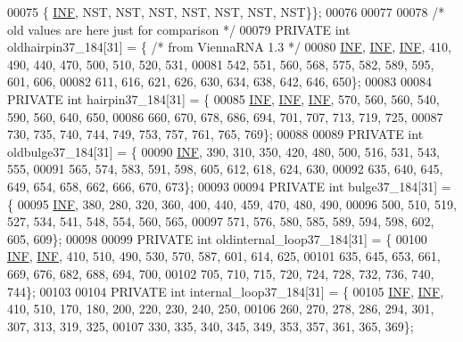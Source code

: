 \begin{DoxyCode}
00075   \{  \hyperlink{energy__const_8h_a12c2040f25d8e3a7b9e1c2024c618cb6}{INF},   NST,   NST,   NST,   NST,   NST,   NST, NST\}\};
00076 
00077 
00078 \textcolor{comment}{/* old values are here just for comparison */}
00079 PRIVATE \textcolor{keywordtype}{int} oldhairpin37\_184[31] = \{ \textcolor{comment}{/* from ViennaRNA 1.3 */}
00080   \hyperlink{energy__const_8h_a12c2040f25d8e3a7b9e1c2024c618cb6}{INF}, \hyperlink{energy__const_8h_a12c2040f25d8e3a7b9e1c2024c618cb6}{INF}, \hyperlink{energy__const_8h_a12c2040f25d8e3a7b9e1c2024c618cb6}{INF}, 410, 490, 440, 470, 500, 510, 520, 531,
00081        542, 551, 560, 568, 575, 582, 589, 595, 601, 606,
00082        611, 616, 621, 626, 630, 634, 638, 642, 646, 650\};
00083 
00084 PRIVATE \textcolor{keywordtype}{int} hairpin37\_184[31] = \{
00085   \hyperlink{energy__const_8h_a12c2040f25d8e3a7b9e1c2024c618cb6}{INF}, \hyperlink{energy__const_8h_a12c2040f25d8e3a7b9e1c2024c618cb6}{INF}, \hyperlink{energy__const_8h_a12c2040f25d8e3a7b9e1c2024c618cb6}{INF}, 570, 560, 560, 540, 590, 560, 640, 650,
00086        660, 670, 678, 686, 694, 701, 707, 713, 719, 725,
00087        730, 735, 740, 744, 749, 753, 757, 761, 765, 769\};
00088 
00089 PRIVATE \textcolor{keywordtype}{int} oldbulge37\_184[31] = \{
00090   \hyperlink{energy__const_8h_a12c2040f25d8e3a7b9e1c2024c618cb6}{INF}, 390, 310, 350, 420, 480, 500, 516, 531, 543, 555,
00091        565, 574, 583, 591, 598, 605, 612, 618, 624, 630,
00092        635, 640, 645, 649, 654, 658, 662, 666, 670, 673\};
00093 
00094 PRIVATE \textcolor{keywordtype}{int} bulge37\_184[31] = \{
00095   \hyperlink{energy__const_8h_a12c2040f25d8e3a7b9e1c2024c618cb6}{INF}, 380, 280, 320, 360, 400, 440, 459, 470, 480, 490,
00096        500, 510, 519, 527, 534, 541, 548, 554, 560, 565,
00097   571, 576, 580, 585, 589, 594, 598, 602, 605, 609\};
00098 
00099 PRIVATE \textcolor{keywordtype}{int} oldinternal\_loop37\_184[31] = \{
00100   \hyperlink{energy__const_8h_a12c2040f25d8e3a7b9e1c2024c618cb6}{INF}, \hyperlink{energy__const_8h_a12c2040f25d8e3a7b9e1c2024c618cb6}{INF}, 410, 510, 490, 530, 570, 587, 601, 614, 625,
00101        635, 645, 653, 661, 669, 676, 682, 688, 694, 700,
00102        705, 710, 715, 720, 724, 728, 732, 736, 740, 744\};
00103 
00104 PRIVATE \textcolor{keywordtype}{int} internal\_loop37\_184[31] = \{
00105   \hyperlink{energy__const_8h_a12c2040f25d8e3a7b9e1c2024c618cb6}{INF}, \hyperlink{energy__const_8h_a12c2040f25d8e3a7b9e1c2024c618cb6}{INF}, 410, 510, 170, 180, 200, 220, 230, 240, 250,
00106        260, 270, 278, 286, 294, 301, 307, 313, 319, 325,
00107        330, 335, 340, 345, 349, 353, 357, 361, 365, 369\};

\end{DoxyCode}
